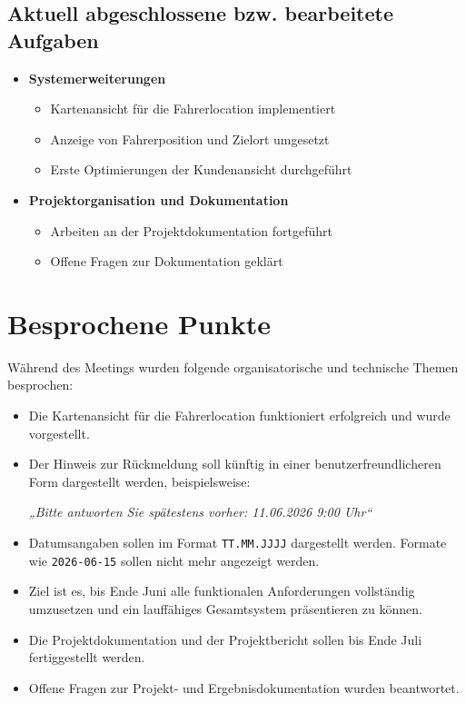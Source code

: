 \documentclass[a4paper,11pt]{article}
\begin{document}
\subsection{Aktuell abgeschlossene bzw. bearbeitete Aufgaben}

\begin{itemize}[leftmargin=1.2cm]

\item \textbf{Systemerweiterungen}
\begin{itemize}
    \item Kartenansicht für die Fahrerlocation implementiert
    \item Anzeige von Fahrerposition und Zielort umgesetzt
    \item Erste Optimierungen der Kundenansicht durchgeführt
\end{itemize}

\item \textbf{Projektorganisation und Dokumentation}
\begin{itemize}
    \item Arbeiten an der Projektdokumentation fortgeführt
    \item Offene Fragen zur Dokumentation geklärt
\end{itemize}

\end{itemize}

\vspace{0.5cm}

\section{Besprochene Punkte}

Während des Meetings wurden folgende organisatorische und technische Themen besprochen:

\begin{itemize}[leftmargin=1.2cm]

\item Die Kartenansicht für die Fahrerlocation funktioniert erfolgreich und wurde vorgestellt.

\item Der Hinweis zur Rückmeldung soll künftig in einer benutzerfreundlicheren Form dargestellt werden, beispielsweise:

\textit{„Bitte antworten Sie spätestens vorher: 11.06.2026 9:00 Uhr“}

\item Datumsangaben sollen im Format \texttt{TT.MM.JJJJ} dargestellt werden. Formate wie \texttt{2026-06-15} sollen nicht mehr angezeigt werden.

\item Ziel ist es, bis Ende Juni alle funktionalen Anforderungen vollständig umzusetzen und ein lauffähiges Gesamtsystem präsentieren zu können.

\item Die Projektdokumentation und der Projektbericht sollen bis Ende Juli fertiggestellt werden.

\item Offene Fragen zur Projekt- und Ergebnisdokumentation wurden beantwortet.

\end{itemize}
\end{document}
